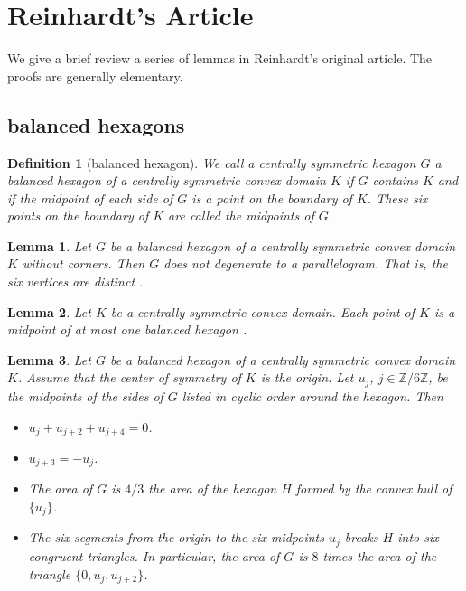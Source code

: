 \documentclass[11pt]{amsart}
\newtheorem{definition}{Definition}
\newtheorem{lemma}{Lemma}
\newcommand{\ring}[1]{\mathbb{#1}}
\begin{document}
\section{Reinhardt's Article}\label{sec:rein}

We give a brief review a series of lemmas in Reinhardt's original article.
The proofs are generally elementary.


\subsection{balanced hexagons}

%
\begin{definition}[balanced hexagon]
We call a centrally symmetric hexagon $G$  a {\it balanced hexagon} of 
a centrally symmetric convex domain $K$
if $G$ contains $K$ and if the midpoint of each side of $G$ is a 
point on the boundary of $K$.  These six points on
the boundary of $K$ are called the midpoints of $G$.
\end{definition}


\begin{lemma}\label{lemma:parallel} Let $G$ be a balanced hexagon of a centrally symmetric convex domain $K$ without corners.  Then $G$ does not degenerate to a parallelogram.  That is, the six vertices are distinct \cite{R}.
\end{lemma}

\begin{lemma}\label{lemma:mid1} 
Let $K$ be a  centrally symmetric convex domain.  Each
point of $K$ is a midpoint of at most one balanced hexagon \cite[p.228]{R}.
\end{lemma}



\begin{lemma}\label{lemma:8G} 
Let $G$ be a balanced hexagon of a centrally symmetric convex domain $K$.  
Assume that the center of symmetry of $K$ is the origin.  
Let $u_j$, $j\in \ring{Z}/6\ring{Z}$,  be the midpoints of the sides of $G$ 
listed in cyclic order around the hexagon.  Then 
 \begin{itemize}
 \item $u_j+u_{j+2}+u_{j+4}=0$.
 \item $u_{j+3} = -u_j$.
 \item The area of $G$ is $4/3$ the area of the hexagon 
     $H$ formed by the convex hull of $\{u_j\}$.
  \item The six segments from the origin to the six midpoints $u_j$ breaks
    $H$ into six congruent triangles.  In particular, the area of $G$
    is $8$ times the area of the triangle $\{0,u_j,u_{j+2}\}$.
  \end{itemize}
\end{lemma}
\end{document}
